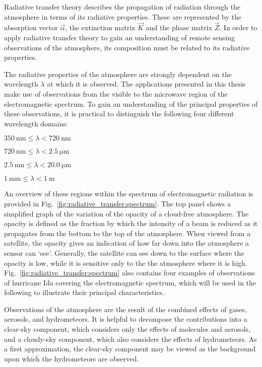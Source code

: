 Radiative transfer theory describes the propagation of radiation through the
atmosphere in terms of its radiative properties. These are represented by the
absorption vector $\vec{\alpha}$, the extinction matrix $\vec{K}$ and the phase
matrix $\vec{Z}$. In order to apply radiative transfer theory to gain an
understanding of remote sensing observations of the atmosphere, its composition
must be related to its radiative properties.

The radiative properties of the atmosphere are strongly dependent on the
wavelength $\lambda$ at which it is observed. The applications presented
in this thesis make use of observations from the visible to the microwave
region of the electromagnetic spectrum. To gain an understanding of the principal
properties of these observations, it is practical to distinguish the following
four different wavelength domains:
\begin{description}[midpenalty=100000]
\item[Visible (VIS):] $\SI{350}{\nano \meter} \leq \lambda < \SI{720}{\nano \meter}$
\item[Near infrared (NIR):] $\SI{720}{\nano \meter} \leq \lambda < \SI{2.5}{\micro \meter}$
\item[Thermal infrared (TIR):] $\SI{2.5}{\nano \meter} \leq \lambda < \SI{20.0}{\micro \meter}$
\item[Microwave (MW):] $\SI{1}{\milli \meter} \leq \lambda < \SI{1}{ \meter}$
\end{description}
An overview of these regions within the spectrum of electromagnetic radiation is
provided in Fig.~\ref{fig:radiative_transfer:spectrum}. The top panel shows a
simplified graph of the variation of the opacity of a cloud-free atmosphere.
The opacity is  defined as the fraction by which the intensity of a beam is reduced as it
propagates from the bottom to the top of the atmosphere. When viewed from a
satellite, the opacity gives an indication of how far down into the
atmosphere a sensor can `see'. Generally, the satellite can see down to the
surface where the opacity is low, while it is sensitive only to the
the atmosphere where it is high. Fig.~\ref{fig:radiative_transfer:spectrum}
also contains four examples of observations of hurricane Ida covering the
electromagnetic spectrum, which will be used in the following to illustrate
their principal characteristics.

Observations of the atmosphere are the result of the combined effects of gases,
aerosols, and hydrometeors. It is helpful to decompose the contributions into a
clear-sky component, which considers only the effects of molecules and
aerosols, and a cloudy-sky component, which also considers the effects of
hydrometeors. As a first approximation, the clear-sky component may be viewed as
the background upon which the hydrometeors are observed.

